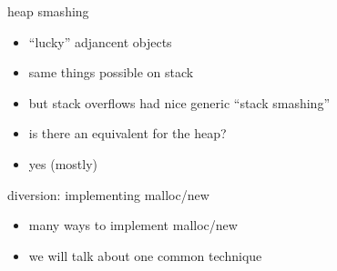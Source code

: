 \begin{frame}{heap smashing}
    \begin{itemize}
    \item ``lucky'' adjancent objects
    \item same things possible on stack
    \item but stack overflows had nice generic ``stack smashing''
    \item is there an equivalent for the heap?
    \item yes (mostly)
    \end{itemize}
\end{frame}

\begin{frame}{diversion: implementing malloc/new}
    \begin{itemize}
    \item many ways to implement malloc/new
    \item we will talk about one common technique
    \end{itemize}
\end{frame}

